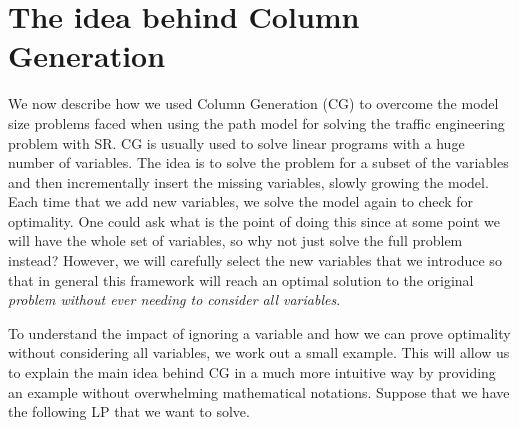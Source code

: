 \section{The idea behind Column Generation}

% 
% 

We now describe how we used Column Generation (CG) \cite{desaulniers2006column} to overcome the model size problems faced when using the path model for
solving the traffic engineering problem with SR. CG is usually used to solve linear programs with a huge number of variables. The idea is to solve the problem for a subset
of the variables and then incrementally insert the missing variables, slowly growing the model. Each time that we add new variables, we solve the model again to check
for optimality. One could ask what
is the point of doing this since at some point we will have the whole set of variables, so why not just solve the full problem instead? However, we will carefully select the 
new variables that we introduce so that in general this framework will reach an optimal solution to the original \emph{problem without ever needing to consider all variables}.

To understand the impact of ignoring a variable and how we can prove optimality without considering all variables, we work out a small example. 
This will allow us to explain the main idea behind CG in a much more 
intuitive way by providing an example without overwhelming mathematical notations. Suppose that we have the following LP that we want to solve.

\begin{center}
\end{center}

